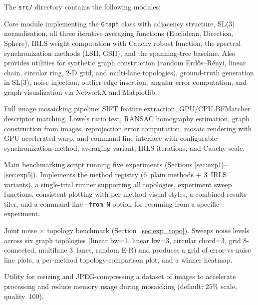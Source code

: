 \documentclass[11pt, a4paper]{article}
\begin{document}
The \texttt{src/} directory contains the following modules:

\begin{description}[leftmargin=*, style=nextline]
    \item[\texttt{graph.py} (1466 lines)]
        Core module implementing the \texttt{Graph} class with adjacency
        structure, SL(3) normalisation, all three iterative averaging functions
        (Euclidean, Direction, Sphere), IRLS weight computation with Cauchy
        robust function, the spectral synchronization methods (LSH, GSH), and
        the spanning-tree baseline.  Also provides utilities for synthetic graph
        construction (random Erd\H{o}s--R\'{e}nyi, linear chain, circular ring,
        2-D grid, and multi-lane topologies), ground-truth generation in SL(3),
        noise injection, outlier edge insertion, angular error computation, and
        graph visualization via NetworkX and Matplotlib.

    \item[\texttt{mosaic.py} (601 lines)]
        Full image mosaicking pipeline: SIFT feature extraction, GPU/CPU
        BFMatcher descriptor matching, Lowe's ratio test, RANSAC homography
        estimation, graph construction from images, reprojection error
        computation, mosaic rendering with GPU-accelerated warp, and
        command-line interface with configurable synchronization method,
        averaging variant, IRLS iterations, and Cauchy scale.

    \item[\texttt{benchmark.py} (831 lines)]
        Main benchmarking script running five experiments (Sections
        \ref{sec:exp1}--\ref{sec:exp5}).  Implements the method registry
        (6~plain methods $+$ 3~IRLS variants), a single-trial runner
        supporting all topologies, experiment sweep functions, consistent
        plotting with per-method visual styles, a combined results tiler,
        and a command-line \texttt{--from N} option for resuming from a
        specific experiment.

    \item[\texttt{benchmark\_noise\_topology.py} (549 lines)]
        Joint noise $\times$ topology benchmark (Section~\ref{sec:exp_topo}).
        Sweeps noise levels across six graph topologies (linear bw=1, linear
        bw=3, circular chord=3, grid 8-connected, multilane 3~lanes, random
        E-R) and produces a grid of error-vs-noise line plots, a per-method
        topology-comparison plot, and a winner heatmap.

    \item[\texttt{compress.py} (49 lines)]
        Utility for resizing and JPEG-compressing a dataset of images to
        accelerate processing and reduce memory usage during mosaicking
        (default: $25\%$ scale, quality~100).
\end{description}
\end{document}
